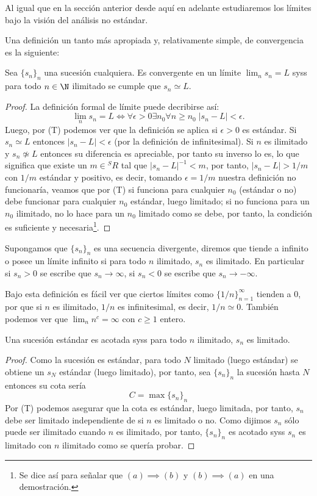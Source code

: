 \documentclass[11pt,oneside,a4paper]{book}
\begin{document}
Al igual que en la sección anterior desde aquí en adelante estudiaremos los límites bajo la visión del análisis no estándar.

Una definición un tanto más apropiada y, relativamente simple, de convergencia es la siguiente:
\begin{thm}\label{thm:non-std-lim}
Sea $\{s_n\}_n$ una sucesión cualquiera. Es convergente en un límite $\lim_n s_n=L$ syss para todo $n\in\N$ ilimitado se cumple que $s_n\simeq L$.
\end{thm}
\begin{proof}
La definición formal de límite puede decribirse así:
$$\lim_n s_n=L\iff\forall\epsilon\gt 0\exists n_0\forall n\geq n_0\;|s_n-L|\lt\epsilon.$$
Luego, por (T) podemos ver que la definición se aplica si $\epsilon\gt 0$ es estándar. Si $s_n\simeq L$ entonces $|s_n-L|\lt\epsilon$ (por la definición de infinitesimal). Si $n$ es ilimitado y $s_n\not\simeq L$ entonces su diferencia es apreciable, por tanto su inverso lo es, lo que significa que existe un $m\in{^SR}$ tal que $|s_n-L|^{-1}\lt m$, por tanto, $|s_n-L|\gt 1/m$ con $1/m$ estándar y positivo, es decir, tomando $\epsilon=1/m$ nuestra definición no funcionaría, veamos que por (T) si funciona para cualquier $n_0$ (estándar o no) debe funcionar para cualquier $n_0$ estándar, luego limitado; si no funciona para un $n_0$ ilimitado, no lo hace para un $n_0$ limitado como se debe, por tanto, la condición es suficiente y necesaria\footnote{Se dice así para señalar que $(a)\implies(b)$ y $(b)\implies(a)$ en una demostración.}.
\end{proof}
\begin{mydef}
Supongamos que $\{s_n\}_n$ es una secuencia divergente, diremos que tiende a infinito o posee un límite infinito si para todo $n$ ilimitado, $s_n$ es ilimitado. En particular si $s_n\gt 0$ se escribe que $s_n\to\infty$, si $s_n\lt 0$ se escribe que $s_n\to-\infty$.
\end{mydef}
Bajo esta definición es fácil ver que ciertos límites como $\{1/n\}_{n=1}^\infty$ tienden a 0, por que si $n$ es ilimitado, $1/n$ es infinitesimal, es decir, $1/n\simeq 0$. También podemos ver que $\lim_n n^c=\infty$ con $c\geq 1$ entero.
\begin{thm}
Una sucesión estándar es acotada syss para todo $n$ ilimitado, $s_n$ es limitado.
\end{thm}
\begin{proof}
Como la sucesión es estándar, para todo $N$ limitado (luego estándar) se obtiene un $s_N$ estándar (luego limitado), por tanto, sea $\{s_n\}_n$ la sucesión hasta $N$ entonces su cota sería
$$C=\max\{s_n\}_n$$
Por (T) podemos asegurar que la cota es estándar, luego limitada, por tanto, $s_n$ debe ser limitado independiente de si $n$ es limitado o no. Como dijimos $s_n$ sólo puede ser ilimitado cuando $n$ es ilimitado, por tanto, $\{s_n\}_n$ es acotado syss $s_n$ es limitado con $n$ ilimitado como se quería probar.
\end{proof}
\end{document}
